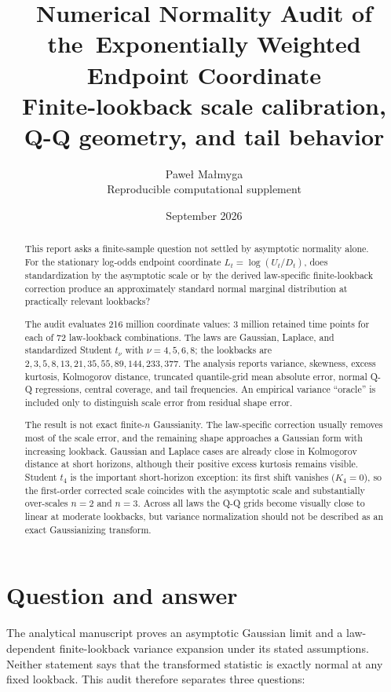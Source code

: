 \documentclass[10pt]{article}
\title{\textbf{Numerical Normality Audit of the\
Exponentially Weighted Endpoint Coordinate}\\[5pt]
\large Finite-lookback scale calibration, Q-Q geometry, and tail behavior}
\author{Pawe{\l} Ma{\l}myga\\
\small Reproducible computational supplement}
\date{September 2026}
\begin{document}
\maketitle

\begin{abstract}
This report asks a finite-sample question not settled by asymptotic normality
alone.  For the stationary log-odds endpoint coordinate
\(L_t=\log(U_t/D_t)\), does standardization by the asymptotic scale or by the
derived law-specific finite-lookback correction produce an approximately
standard normal marginal distribution at practically relevant lookbacks?

The audit evaluates 216 million coordinate values: 3 million retained time
points for each of 72 law-lookback combinations.  The laws are Gaussian,
Laplace, and standardized Student \(t_\nu\) with \(\nu=4,5,6,8\); the lookbacks
are \(2,3,5,8,13,21,35,55,89,144,233,377\).  The analysis reports variance,
skewness, excess kurtosis, Kolmogorov distance, truncated quantile-grid mean
absolute error, normal Q-Q regressions, central coverage, and tail frequencies.  An empirical
variance ``oracle'' is included only to distinguish scale error from residual
shape error.

The result is not exact finite-\(n\) Gaussianity.  The law-specific correction
usually removes most of the scale error, and the remaining shape approaches a
Gaussian form with increasing lookback.  Gaussian and Laplace cases are
already close in Kolmogorov distance at short horizons, although their
positive excess kurtosis remains visible.  Student \(t_4\) is the important
short-horizon exception: its first shift vanishes (\(K_4=0\)), so the
first-order corrected scale coincides with the asymptotic scale and substantially over-scales
\(n=2\) and \(n=3\).  Across all laws the Q-Q grids
become visually close to linear at moderate lookbacks, but variance
normalization should not be described as an exact Gaussianizing transform.
\end{abstract}

\section{Question and answer}

The analytical manuscript proves an asymptotic Gaussian limit and a
law-dependent finite-lookback variance expansion under its stated
assumptions.  Neither statement says that the transformed statistic is exactly
normal at any fixed lookback.  This audit therefore separates three questions:
\end{document}
